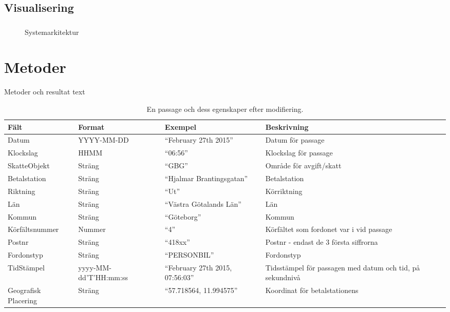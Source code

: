 \documentclass{kththesis}
\begin{document}
\section{Visualisering} 
\subsection{} 

\begin{figure}[hbtp]
\centering

\caption{Systemarkitektur}
\end{figure}



\chapter{Metoder}
Metoder och resultat text
\blindtext

\captionsetup[table]{name=Tabel}

\begin{table}[h!]
  \begin{center}
    \caption{En passage och dess egenskaper efter modifiering.}
    \label{tab:table1}
    \begin{tabular}{|p{3cm}|p{3cm}|p{3cm}|p{3cm}|}
         \hline
      \textbf{Fält} & \textbf{Format} & \textbf{Exempel} & \textbf{Beskrivning}\\
      \hline
      Datum & YYYY-MM-DD & “February 27th 2015” & Datum för passage\\ %
        \hline
      Klockslag & HHMM& “06:56” & Klockslag för passage\\ %
        \hline
      SkatteObjekt & Sträng & “GBG”
 & Område för avgift/skatt\\ %
        \hline
      Betalstation & Sträng & “Hjalmar Brantingsgatan” & Betalstation\\ %
        \hline
      Riktning & Sträng & “Ut” & Körriktning\\ %
        \hline
      Län & Sträng & “Västra Götalands Län” & Län\\ %
        \hline
      Kommun & Sträng & “Göteborg” & Kommun\\ %
        \hline
      Körfältsnummer & Nummer & “4” &  Körfältet som fordonet var i vid passage\\ %
        \hline
          Postnr & Sträng & “418xx”
 & Postnr - endast de 3 första siffrorna\\ %
        \hline
          Fordonstyp & Sträng & “PERSONBIL” & Fordonstyp\\ %
        \hline
          TidStämpel & yyyy-MM-dd'T'HH:mm:ss
 & “February 27th 2015, 07:56:03” & Tidsstämpel för passagen med datum och tid, på sekundnivå 
\\ %
        \hline
Geografisk Placering & Sträng & “57.718564, 11.994575” & 
Koordinat för betalstationens 
\\ %
        \hline
    \end{tabular}
  \end{center}
\end{table}
\end{document}
